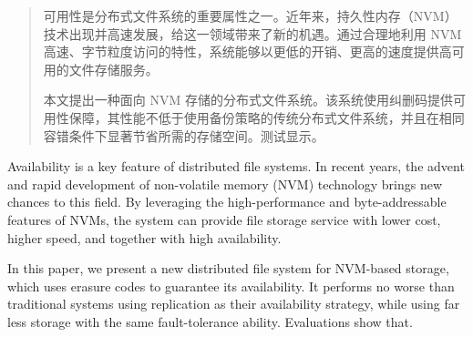 

\begin{abstract}
  可用性是分布式文件系统的重要属性之一。近年来，持久性内存（NVM）技术出现并高速发展，给这一领域带来了新的机遇。通过合理地利用 NVM 高速、字节粒度访问的特性，系统能够以更低的开销、更高的速度提供高可用的文件存储服务。

  本文提出一种面向 NVM 存储的分布式文件系统。该系统使用纠删码提供可用性保障，其性能不低于使用备份策略的传统分布式文件系统，并且在相同容错条件下显著节省所需的存储空间。测试显示。

\end{abstract}

\begin{abstract*}
  Availability is a key feature of distributed file systems. In recent years, the advent and rapid development of non-volatile memory (NVM) technology brings new chances to this field. By leveraging the high-performance and byte-addressable features of NVMs, the system can provide file storage service with lower cost, higher speed, and together with high availability.

  In this paper, we present a new distributed file system for NVM-based storage, which uses erasure codes to guarantee its availability. It performs no worse than traditional systems using replication as their availability strategy, while using far less storage with the same fault-tolerance ability. Evaluations show that. 

\end{abstract*}
